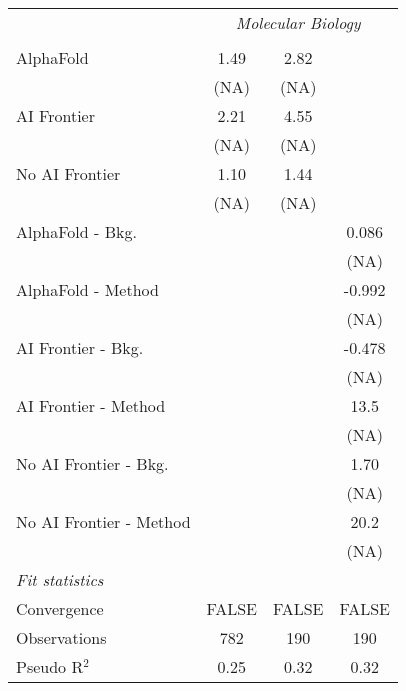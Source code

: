 \begin{tabular}{lccc}
 & \multicolumn{3}{c}{\textit{Molecular Biology}} \\ \\
   AlphaFold               & 1.49 & 2.82  &   \\   
                           & (NA) & (NA)  &   \\   
   AI Frontier             & 2.21 & 4.55  &   \\   
                           & (NA) & (NA)  &   \\   
   No AI Frontier          & 1.10 & 1.44  &   \\   
                           & (NA) & (NA)  &   \\   
   AlphaFold - Bkg.        &      &       & 0.086\\   
                           &      &       & (NA)\\   
   AlphaFold - Method      &      &       & -0.992\\   
                           &      &       & (NA)\\   
   AI Frontier - Bkg.      &      &       & -0.478\\   
                           &      &       & (NA)\\   
   AI Frontier - Method    &      &       & 13.5\\   
                           &      &       & (NA)\\   
   No AI Frontier - Bkg.   &      &       & 1.70\\   
                           &      &       & (NA)\\   
   No AI Frontier - Method &      &       & 20.2\\   
                           &      &       & (NA)\\   
   \midrule
   \emph{Fit statistics}\\
   Convergence             &FALSE & FALSE & FALSE\\  
   Observations            & 782  & 190   & 190\\  
   Pseudo R$^2$            & 0.25 & 0.32  & 0.32\\  
   

\end{tabular}
